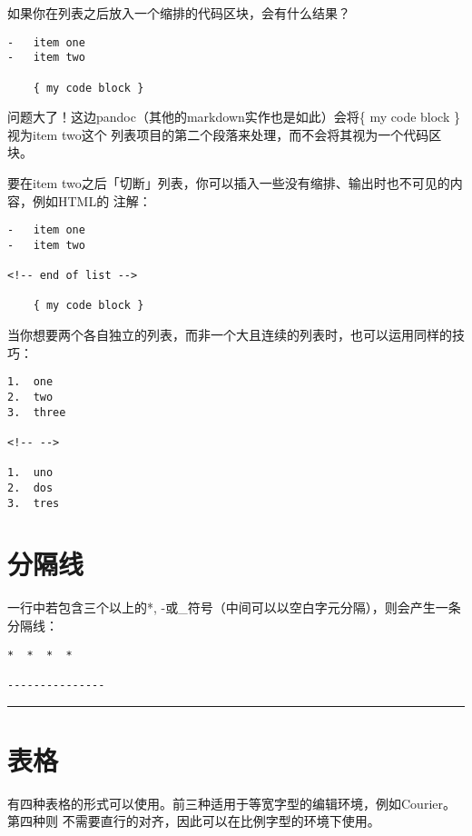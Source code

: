 \documentclass[cn]{elegantbook}
\begin{document}
如果你在列表之后放入一个缩排的代码区块，会有什么结果？

\begin{lstlisting}
-   item one
-   item two

    { my code block }
\end{lstlisting}

问题大了！这边pandoc（其他的markdown实作也是如此）会将\{ my code block
\}视为item two这个
列表项目的第二个段落来处理，而不会将其视为一个代码区块。

要在item
two之后「切断」列表，你可以插入一些没有缩排、输出时也不可见的内容，例如HTML的
注解：

\begin{lstlisting}
-   item one
-   item two

<!-- end of list -->

    { my code block }
\end{lstlisting}

当你想要两个各自独立的列表，而非一个大且连续的列表时，也可以运用同样的技巧：

\begin{lstlisting}
1.  one
2.  two
3.  three

<!-- -->

1.  uno
2.  dos
3.  tres
\end{lstlisting}

\hypertarget{ux5206ux9694ux7ebf}{%
\section{分隔线}\label{ux5206ux9694ux7ebf}}

一行中若包含三个以上的*,
-或\_符号（中间可以以空白字元分隔），则会产生一条分隔线：

\begin{lstlisting}
*  *  *  *

---------------
\end{lstlisting}

\begin{center}\rule{0.5\linewidth}{\linethickness}\end{center}

\hypertarget{ux8868ux683c}{%
\section{表格}\label{ux8868ux683c}}

有四种表格的形式可以使用。前三种适用于等宽字型的编辑环境，例如Courier。第四种则
不需要直行的对齐，因此可以在比例字型的环境下使用。
\end{document}
